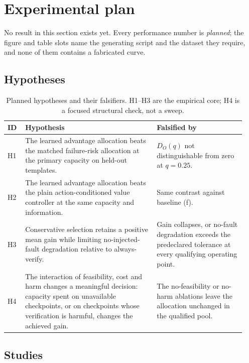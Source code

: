\section{Experimental plan}
\label{sec:b-experiments}

No result in this section exists yet.  Every performance number is
\emph{planned}; the figure and table slots name the generating script and the
dataset they require, and none of them contains a fabricated curve.

\subsection{Hypotheses}

\begin{table}[t]
\centering
\small
\setlength{\tabcolsep}{4pt}
\begin{tabular}{@{}p{0.07\linewidth}p{0.52\linewidth}p{0.35\linewidth}@{}}
\toprule
ID & Hypothesis & Falsified by \\
\midrule
H1 & The learned advantage allocation beats the matched failure-risk allocation
at the primary capacity on held-out templates. & $D_O(q)$ not distinguishable
from zero at $q=0.25$. \\
H2 & The learned advantage allocation beats the plain action-conditioned value
controller at the same capacity and information. & Same contrast against
baseline (f). \\
H3 & Conservative selection retains a positive mean gain while limiting
no-injected-fault degradation relative to always-verify. & Gain collapses, or
no-fault degradation exceeds the predeclared tolerance at every qualifying
operating point. \\
H4 & The interaction of feasibility, cost and harm changes a meaningful
decision: capacity spent on unavailable checkpoints, or on checkpoints whose
verification is harmful, changes the achieved gain. & The no-feasibility or
no-harm ablations leave the allocation unchanged in the qualified pool. \\
\bottomrule
\end{tabular}
\caption{Planned hypotheses and their falsifiers.  H1--H3 are the empirical
core; H4 is a focused structural check, not a sweep.}
\label{tab:b-hypotheses}
\end{table}

\subsection{Studies}


